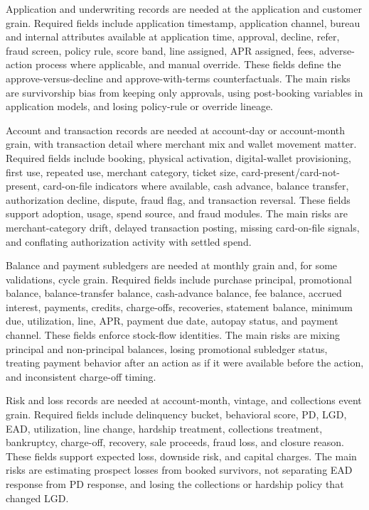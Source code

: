 \documentclass[11pt]{article}
\newcommand{\1}{\mathbf{1}}
\begin{document}
Application and underwriting records are needed at the application and
customer grain. Required fields include application timestamp, application
channel, bureau and internal attributes available at application time,
approval, decline, refer, fraud screen, policy rule, score band, line assigned,
APR assigned, fees, adverse-action process where applicable, and manual
override. These fields define the approve-versus-decline and
approve-with-terms counterfactuals. The main risks are survivorship bias from
keeping only approvals, using post-booking variables in application models,
and losing policy-rule or override lineage.

Account and transaction records are needed at account-day or account-month
grain, with transaction detail where merchant mix and wallet movement matter.
Required fields include booking, physical activation, digital-wallet
provisioning, first use, repeated use, merchant category, ticket size,
card-present/card-not-present, card-on-file indicators where available, cash
advance, balance transfer, authorization decline, dispute, fraud flag, and
transaction reversal. These fields support adoption, usage, spend source, and
fraud modules. The main risks are merchant-category drift, delayed transaction
posting, missing card-on-file signals, and conflating authorization activity
with settled spend.

Balance and payment subledgers are needed at monthly grain and, for some
validations, cycle grain. Required fields include purchase principal,
promotional balance, balance-transfer balance, cash-advance balance, fee
balance, accrued interest, payments, credits, charge-offs, recoveries,
statement balance, minimum due, utilization, line, APR, payment due date,
autopay status, and payment channel. These fields enforce stock-flow
identities. The main risks are mixing principal and non-principal balances,
losing promotional subledger status, treating payment behavior after an action
as if it were available before the action, and inconsistent charge-off timing.

Risk and loss records are needed at account-month, vintage, and collections
event grain. Required fields include delinquency bucket, behavioral score,
PD, LGD, EAD, utilization, line change, hardship treatment, collections
treatment, bankruptcy, charge-off, recovery, sale proceeds, fraud loss, and
closure reason. These fields support expected loss, downside risk, and capital
charges. The main risks are estimating prospect losses from booked survivors,
not separating EAD response from PD response, and losing the collections or
hardship policy that changed LGD.
\end{document}
